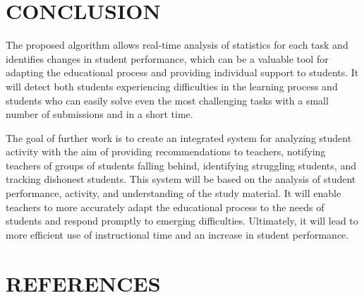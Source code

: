 \documentclass{article}
\begin{document}
\begin{multicols}{2}
\begin{justify}
      \section{CONCLUSION}
      The proposed algorithm allows real-time analysis of statistics for each task and identifies changes in student performance, which can be a valuable tool for adapting the educational process and providing individual support to students. It will detect both students experiencing difficulties in the learning process and students who can easily solve even the most challenging tasks with a small number of submissions and in a short time.

      The goal of further work is to create an integrated system for analyzing student activity with the aim of providing recommendations to teachers, notifying teachers of groups of students falling behind, identifying struggling students, and tracking dishonest students. This system will be based on the analysis of student performance, activity, and understanding of the study material. It will enable teachers to more accurately adapt the educational process to the needs of students and respond promptly to emerging difficulties. Ultimately, it will lead to more efficient use of instructional time and an increase in student performance. 

      \section*{REFERENCES}
      \begin{footnotesize}
        
      \end{footnotesize}

    \end{justify}
  \end{multicols}      
\end{document}
